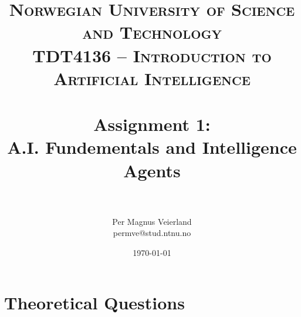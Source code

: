

\title{	
\normalfont \normalsize 
\textsc{Norwegian University of Science and Technology\\TDT4136 -- Introduction to Artificial Intelligence} \\ [25pt]
\horrule{0.5pt} \\[0.4cm]
\huge Assignment 1:\\ A.I. Fundementals and Intelligence Agents\\
\horrule{2pt} \\[0.5cm]
}

\author{Per Magnus Veierland\\permve@stud.ntnu.no}

\date{\normalsize\today} %


\maketitle

\section*{Theoretical Questions}


